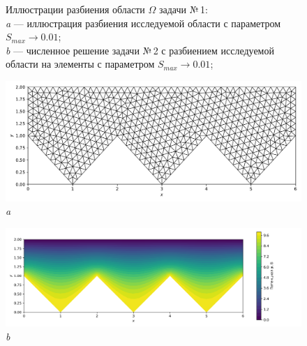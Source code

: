\documentclass[12pt, a4paper]{article}
\begin{document}
\begin{figure}[h]
\begin{center}
				\end{center} 
				\vspace*{-0.0mm} 
				\caption{Иллюстрации разбиения области $\Omega$ задачи №\,1:\\
					\textit{a} --- иллюстрация разбиения исследуемой области с параметром $S_{max} \rightarrow 0.01$; \\
					\textit{b} --- численное решение задачи №\,2 с разбиением исследуемой области на  элементы с параметром $S_{max} \rightarrow 0.01$; \\
				} 
			\end{figure}
			
						
			\newpage
			
			\begin{figure}[h]       
				\vspace{5.0mm} 
				\begin{center} 
					{ 
						\begin{minipage}{0.9\textwidth} 
							\centering 
							\hspace*{-8mm}
							\includegraphics[width=0.9\columnwidth]{Test_domain_4_mesh001_3_in_row_calfem_net.pdf}\\ 
							\textit{a} 
						\end{minipage}                                 
					} 
					{ 
						\begin{minipage}{1\textwidth} 
							\centering 
							\hspace*{-15.4mm}
							\includegraphics[width=1.2\columnwidth]{Test_domain_4_mesh001_3_in_row_calfem.png}\\ 
							\textit{b} 
						\end{minipage}                                 
					} 
								

\end{center}
\end{figure}
\end{document}
